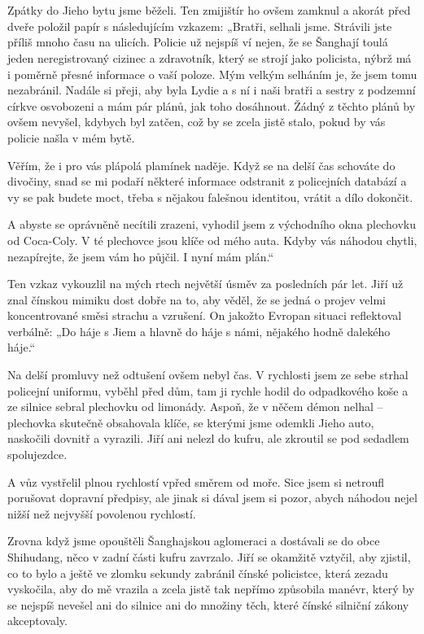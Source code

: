 \chapter{}

Zpátky do Jieho bytu jsme běželi. Ten zmijištír ho ovšem zamknul a akorát před dveře položil papír s následujícím vzkazem: „Bratři, selhali jsme. Strávili jste příliš mnoho času na ulicích. Policie už nejspíš ví nejen, že se Šanghají toulá jeden neregistrovaný cizinec a zdravotník, který se strojí jako policista, nýbrž má i poměrně přesné informace o vaší poloze. Mým velkým selháním je, že jsem tomu nezabránil. Nadále si přeji, aby byla Lydie a s ní i naši bratři a sestry z podzemní církve osvobozeni a mám pár plánů, jak toho dosáhnout. Žádný z těchto plánů by ovšem nevyšel, kdybych byl zatčen, což by se zcela jistě stalo, pokud by vás policie našla v mém bytě.

Věřím, že i pro vás plápolá plamínek naděje. Když se na delší čas schováte do divočiny, snad se mi podaří některé informace odstranit z policejních databází a vy se pak budete moct, třeba s nějakou falešnou identitou, vrátit a dílo dokončit.

A abyste se oprávněně necítili zrazeni, vyhodil jsem z východního okna plechovku od Coca-Coly. V té plechovce jsou klíče od mého auta. Kdyby vás náhodou chytli, nezapírejte, že jsem vám ho půjčil. I nyní mám plán.“

Ten vzkaz vykouzlil na mých rtech největší úsměv za posledních pár let. Jiří už znal čínskou mimiku dost dobře na to, aby věděl, že se jedná o projev velmi koncentrované směsi strachu a vzrušení. On jakožto Evropan situaci reflektoval verbálně: „Do háje s Jiem a hlavně do háje s námi, nějakého hodně dalekého háje.“

Na delší promluvy než odtušení ovšem nebyl čas. V rychlosti jsem ze sebe strhal policejní uniformu, vyběhl před dům, tam ji rychle hodil do odpadkového koše a ze silnice sebral plechovku od limonády.  Aspoň, že v něčem démon nelhal – plechovka skutečně obsahovala klíče, se kterými jsme odemkli Jieho auto, naskočili dovnitř a vyrazili. Jiří ani nelezl do kufru, ale zkroutil se pod sedadlem spolujezdce.

A vůz vystřelil plnou rychlostí vpřed směrem od moře. Sice jsem si netroufl porušovat dopravní předpisy, ale jinak si dával jsem si pozor, abych náhodou nejel nižší než nejvyšší povolenou rychlostí.

Zrovna když jsme opouštěli Šanghajskou aglomeraci a dostávali se do obce Shihudang, něco v zadní části kufru zavrzalo. Jiří se okamžitě vztyčil, aby zjistil, co to bylo a ještě ve zlomku sekundy zabránil čínské policistce, která zezadu vyskočila, aby do mě vrazila a zcela jistě tak nepřímo způsobila manévr, který by se nejspíš nevešel ani do silnice ani do množiny těch, které čínské silniční zákony akceptovaly.

